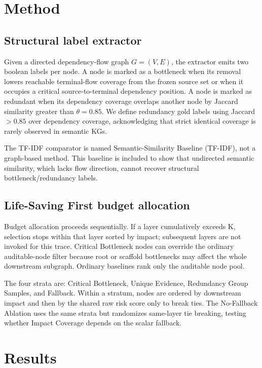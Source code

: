 \documentclass[pdflatex,sn-mathphys-num]{sn-jnl}
\begin{document}
\section{Method}\label{sec:method}

\subsection{Structural label extractor}

Given a directed dependency-flow graph $G=(V,E)$, the extractor emits two boolean labels per node. A node is marked as a bottleneck when its removal lowers reachable terminal-flow coverage from the frozen source set or when it occupies a critical source-to-terminal dependency position. A node is marked as redundant when its dependency coverage overlaps another node by Jaccard similarity greater than $\theta=0.85$. We define redundancy gold labels using Jaccard $>0.85$ over dependency coverage, acknowledging that strict identical coverage is rarely observed in semantic KGs.

The TF-IDF comparator is named Semantic-Similarity Baseline (TF-IDF), not a graph-based method. This baseline is included to show that undirected semantic similarity, which lacks flow direction, cannot recover structural bottleneck/redundancy labels.

\subsection{Life-Saving First budget allocation}

Budget allocation proceeds sequentially. If a layer cumulatively exceeds K, selection stops within that layer sorted by impact; subsequent layers are not invoked for this trace. Critical Bottleneck nodes can override the ordinary auditable-node filter because root or scaffold bottlenecks may affect the whole downstream subgraph. Ordinary baselines rank only the auditable node pool.

The four strata are: Critical Bottleneck, Unique Evidence, Redundancy Group Samples, and Fallback. Within a stratum, nodes are ordered by downstream impact and then by the shared raw risk score only to break ties. The No-Fallback Ablation uses the same strata but randomizes same-layer tie breaking, testing whether Impact Coverage depends on the scalar fallback.

\section{Results}\label{sec:results}
\end{document}
